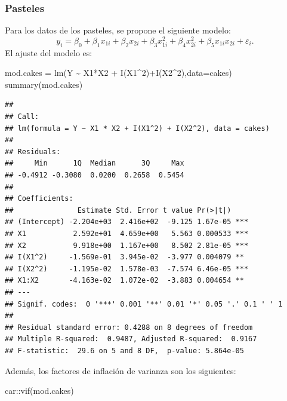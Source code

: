 \documentclass[
]{article}
\newenvironment{Shaded}{\begin{snugshade}}{\end{snugshade}}
\newcommand{\AttributeTok}[1]{\textcolor[rgb]{0.77,0.63,0.00}{#1}}
\newcommand{\DecValTok}[1]{\textcolor[rgb]{0.00,0.00,0.81}{#1}}
\newcommand{\FunctionTok}[1]{\textcolor[rgb]{0.00,0.00,0.00}{#1}}
\newcommand{\NormalTok}[1]{#1}
\newcommand{\OtherTok}[1]{\textcolor[rgb]{0.56,0.35,0.01}{#1}}
\newcommand{\SpecialCharTok}[1]{\textcolor[rgb]{0.00,0.00,0.00}{#1}}
\begin{document}
\hypertarget{pasteles-1}{%
\subsubsection{Pasteles}\label{pasteles-1}}

Para los datos de los pasteles, se propone el siguiente modelo:
\[
y_{i} = \beta_{0} + \beta_{1}x_{1i} + \beta_{2}x_{2i} + \beta_{3}x_{1i}^2 + \beta_{4}x_{2i}^{2} + \beta_{5}x_{1i}x_{2i} + \varepsilon_{i}.
\]
El ajuste del modelo es:

\begin{Shaded}
\begin{Highlighting}[]
\NormalTok{mod.cakes }\OtherTok{=} \FunctionTok{lm}\NormalTok{(Y }\SpecialCharTok{\textasciitilde{}}\NormalTok{ X1}\SpecialCharTok{*}\NormalTok{X2 }\SpecialCharTok{+} \FunctionTok{I}\NormalTok{(X1}\SpecialCharTok{\^{}}\DecValTok{2}\NormalTok{)}\SpecialCharTok{+}\FunctionTok{I}\NormalTok{(X2}\SpecialCharTok{\^{}}\DecValTok{2}\NormalTok{),}\AttributeTok{data=}\NormalTok{cakes)}
\FunctionTok{summary}\NormalTok{(mod.cakes)}
\end{Highlighting}
\end{Shaded}

\begin{verbatim}
## 
## Call:
## lm(formula = Y ~ X1 * X2 + I(X1^2) + I(X2^2), data = cakes)
## 
## Residuals:
##     Min      1Q  Median      3Q     Max 
## -0.4912 -0.3080  0.0200  0.2658  0.5454 
## 
## Coefficients:
##               Estimate Std. Error t value Pr(>|t|)    
## (Intercept) -2.204e+03  2.416e+02  -9.125 1.67e-05 ***
## X1           2.592e+01  4.659e+00   5.563 0.000533 ***
## X2           9.918e+00  1.167e+00   8.502 2.81e-05 ***
## I(X1^2)     -1.569e-01  3.945e-02  -3.977 0.004079 ** 
## I(X2^2)     -1.195e-02  1.578e-03  -7.574 6.46e-05 ***
## X1:X2       -4.163e-02  1.072e-02  -3.883 0.004654 ** 
## ---
## Signif. codes:  0 '***' 0.001 '**' 0.01 '*' 0.05 '.' 0.1 ' ' 1
## 
## Residual standard error: 0.4288 on 8 degrees of freedom
## Multiple R-squared:  0.9487, Adjusted R-squared:  0.9167 
## F-statistic:  29.6 on 5 and 8 DF,  p-value: 5.864e-05
\end{verbatim}

Además, los factores de inflación de varianza son los siguientes:

\begin{Shaded}
\begin{Highlighting}[]
\NormalTok{car}\SpecialCharTok{::}\FunctionTok{vif}\NormalTok{(mod.cakes)}
\end{Highlighting}
\end{Shaded}
\end{document}
